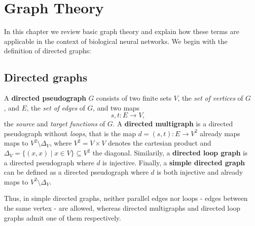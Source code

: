 \chapter{Graph Theory}\label{ch:Graph_theory} 
In this chapter we review basic graph theory and explain how these
terms are applicable in the context of biological neural networks. We
begin with the definition of directed graphs: %

\section{Directed graphs}\label{sec:directed_graphs}





\begin{definition}
  A \textbf{directed pseudograph} $G$ consists of two finite  sets $V$, the \textit{set of vertices} of $G$, and
  $E$, the \textit{set of edges} of $G$, and two maps
  \[
  s,t: E \to V,
  \]
  the \textit{source} and \textit{target functions} of $G$. A
  \textbf{directed multigraph} is a directed pseudograph without
  \textit{loops}, that is the map $d = (s,t):E \to V^2$ already maps
  maps to $V^2\setminus\Delta_V$, where $V^2 = V \times V$ denotes the
  cartesian product and $\Delta_V = \{(x,x) \mid x \in V\} \subseteq V^2$
  the diagonal. Similarily, a \textbf{directed loop graph} is a
  directed pseudograph where $d$ is injective. Finally, a
  \textbf{simple directed graph} can be defined as a directed
  pseudograph where $d$ is both injective and already maps to
  $V^2\setminus\Delta_V$.
\end{definition}
Thus, in simple directed graphs, neither parallel edges nor loops -
edges between the same vertex - are allowed, whereas directed
multigraphs and directed loop graphs admit one of them respectively.


